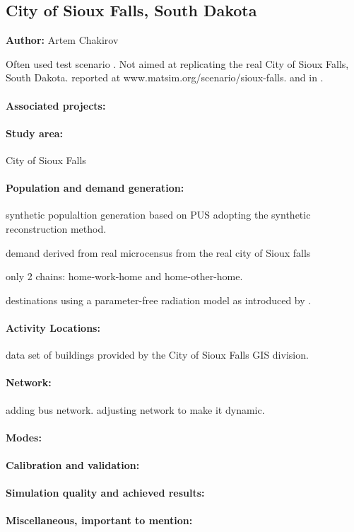 \subsection{City of Sioux Falls, South Dakota}
\label{ch:scenarios:siouxfalls}
\hfill \textbf{Author:} Artem Chakirov

Often used test scenario \citep[][]{BarGera_TNTP_Webpage_2013}. Not aimed at replicating the real City of Sioux Falls, South Dakota.
reported at www.matsim.org/scenario/sioux-falls.
and in \citet[][]{ChakirovFourie_TechRep_FCL_2014}.


\paragraph{Associated projects:} 

\paragraph{Study area:} City of Sioux Falls

\paragraph{Population and demand generation:}
synthetic populaltion generation based on PUS adopting the synthetic reconstruction method.

demand
derived from real microcensus from the real city of Sioux falls

only 2 chains: home-work-home and home-other-home.

destinations using a parameter-free radiation model as introduced by \citet[][]{SiminiEtAl_NAT_2012}.

\paragraph{Activity Locations:} data set of buildings provided by the City of Sioux Falls GIS division.

\paragraph{Network:} adding bus network. adjusting network to make it dynamic.

\paragraph{Modes:}

\paragraph{Calibration and validation:}

\paragraph{Simulation quality and achieved results:}

\paragraph{Miscellaneous, important to mention:}

